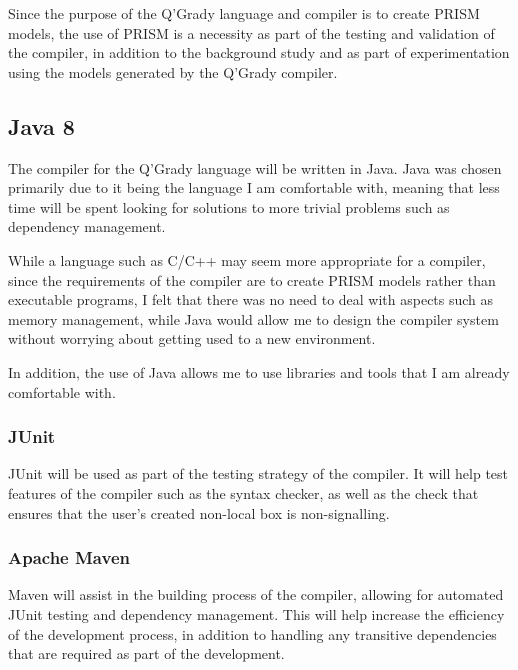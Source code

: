 \documentclass[11pt, a4paper]{article}
\begin{document}
Since the purpose of the Q'Grady language and compiler is to create PRISM
models, the use of PRISM is a necessity as part of the testing and validation of
the compiler, in addition to the background study and as part of experimentation
using the models generated by the Q'Grady compiler.



\subsection{Java 8}
\label{sub:java_eight}
The compiler for the Q'Grady language will be written in Java. Java was chosen
primarily due to it being the language I am comfortable with, meaning that less
time will be spent looking for solutions to more trivial problems such as
dependency management.

While a language such as C/C++ may seem more appropriate for a compiler, since
the requirements of the compiler are to create PRISM models rather than
executable programs, I felt that there was no need to deal with aspects such as
memory management, while Java would allow me to design the compiler system
without worrying about getting used to a new environment.

In addition, the use of Java allows me to use libraries and tools that I am
already comfortable with.


\subsubsection{JUnit}
\label{sub:junit}
JUnit will be used as part of the testing strategy of the compiler. It will help
test features of the compiler such as the syntax checker, as well as the check
that ensures that the user's created non-local box is non-signalling.


\subsubsection{Apache Maven}
\label{sub:maven}
Maven will assist in the building process of the compiler, allowing for 
automated JUnit testing and dependency management. This will help increase the
efficiency of the development process, in addition to handling any transitive
dependencies that are required as part of the development.
\end{document}
